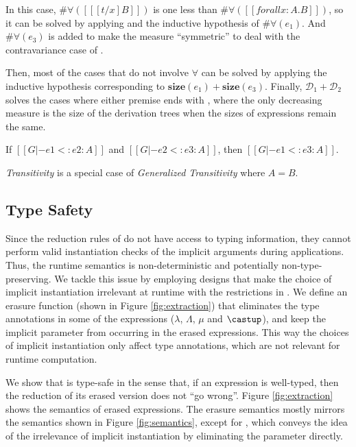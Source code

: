 \noindent In this case, $\#\forall({[[ [t / x] B]]})$ is one less than $\#\forall([[forall x : A. B]])$,
so it can be solved by applying  and the inductive hypothesis of $\#\forall(e_1)$.
And $\#\forall(e_3)$ is added to make the measure ``symmetric''
to deal with the contravariance case of .

Then, most of the cases that do not involve $\forall$ can be
solved by applying the inductive hypothesis corresponding to
$\mathbf{size}(e_1) + \mathbf{size}(e_3)$.
Finally, $\mathcal{D}_1 + \mathcal{D}_2$ solves
the cases where either premise ends with , where the only decreasing
measure is the size of the derivation trees when the sizes of expressions remain
the same.

\begin{corollary}[Transitivity]
    If $[[G |- e1 <: e2 : A]]$ and $[[G |- e2 <: e3 : A]]$,
    then $[[G |- e1 <: e3 : A]]$.
\end{corollary}

\emph{Transitivity} is a special case of
\emph{Generalized Transitivity} where $A = B$.

\subsection{Type Safety}
\label{sec:type-safety}

Since the reduction rules of \name do not have access to typing information, they
cannot perform valid instantiation checks of the implicit arguments during applications.
Thus, the runtime semantics is non-deterministic and potentially non-type-preserving.
We tackle this issue by employing designs that make the choice of implicit instantiation
irrelevant at runtime with the restrictions in .
We define an erasure function (shown in Figure \ref{fig:extraction})
that eliminates the type annotations
in some of the expressions ($\lambda$, $\Lambda$, $\mu$ and $\castup$),
and keep the implicit parameter from occurring in the erased expressions.
This way the choices of implicit instantiation only affect type annotations,
which are not relevant for runtime computation.

We show that \name is type-safe in the sense that,
if an expression is well-typed, then the reduction of its erased version
does not ``go wrong''. Figure \ref{fig:extraction} shows the semantics of
erased expressions. The erasure semantics mostly mirrors the semantics
shown in Figure \ref{fig:semantics}, except for , which
conveys the idea of the irrelevance of implicit instantiation by eliminating the
parameter directly.

